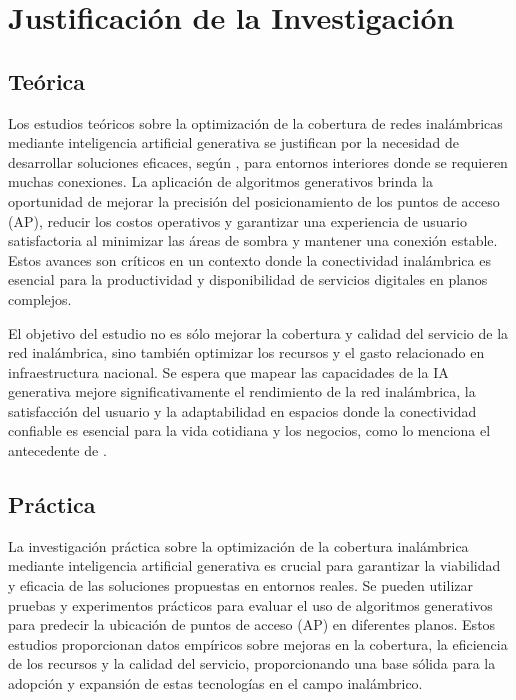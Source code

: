 \section{Justificación de la Investigación}

\subsection{Teórica}
Los estudios teóricos sobre la optimización de la cobertura de redes inalámbricas mediante inteligencia artificial generativa se justifican por la necesidad de desarrollar soluciones eficaces, según \cite{pr_nauata2021housegan}, para entornos interiores donde se requieren muchas conexiones. La aplicación de algoritmos generativos brinda la oportunidad de mejorar la precisión del posicionamiento de los puntos de acceso (AP), reducir los costos operativos y garantizar una experiencia de usuario satisfactoria al minimizar las áreas de sombra y mantener una conexión estable. Estos avances son críticos en un contexto donde la conectividad inalámbrica es esencial para la productividad y disponibilidad de servicios digitales en planos complejos. 

El objetivo del estudio no es sólo mejorar la cobertura y calidad del servicio de la red inalámbrica, sino también optimizar los recursos y el gasto relacionado en infraestructura nacional. Se espera que mapear las capacidades de la IA generativa mejore significativamente el rendimiento de la red inalámbrica, la satisfacción del usuario y la adaptabilidad en espacios donde la conectividad confiable es esencial para la vida cotidiana y los negocios, como lo menciona el antecedente de \cite{pr_alathari2023optaps}.

\subsection{Práctica}
La investigación práctica sobre la optimización de la cobertura inalámbrica mediante inteligencia artificial generativa es crucial para garantizar la viabilidad y eficacia de las soluciones propuestas en entornos reales. Se pueden utilizar pruebas y experimentos prácticos para evaluar el uso de algoritmos generativos para predecir la ubicación de puntos de acceso (AP) en diferentes planos. Estos estudios proporcionan datos empíricos sobre mejoras en la cobertura, la eficiencia de los recursos y la calidad del servicio, proporcionando una base sólida para la adopción y expansión de estas tecnologías en el campo inalámbrico.

